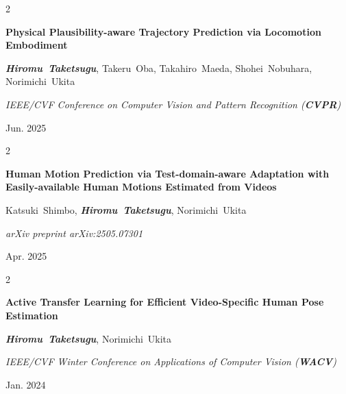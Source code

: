 \documentclass[10pt, letterpaper]{article}
\newenvironment{twocolentry}[2][]{
    \onecolentry
    \def\secondColumn{#2}
    \setcolumnwidth{\fill, 4.5 cm}
    \begin{paracol}{2}
}{
    \switchcolumn \raggedleft \secondColumn
    \end{paracol}
    \endonecolentry
} %
\begin{document}
        \vspace{0.2 cm}
        
        \begin{samepage}
            \begin{twocolentry}{
                Jun. 2025
            }
                \textbf{Physical Plausibility-aware Trajectory Prediction via Locomotion Embodiment}

                \vspace{0.10 cm}

                \mbox{\textbf{\textit{Hiromu Taketsugu}}}, \mbox{Takeru Oba}, \mbox{Takahiro Maeda}, \mbox{Shohei Nobuhara}, \mbox{Norimichi Ukita}
                \vspace{0.10 cm}

                \textit{IEEE/CVF Conference on Computer Vision and Pattern Recognition (\textbf{CVPR})}
            \end{twocolentry}
        \end{samepage}

        \vspace{0.2 cm}

        \begin{samepage}
            \begin{twocolentry}{
                Apr. 2025
            }
                \textbf{Human Motion Prediction via Test-domain-aware Adaptation with Easily-available Human Motions Estimated from Videos}

                \vspace{0.10 cm}

                \mbox{Katsuki Shimbo}, \mbox{\textbf{\textit{Hiromu Taketsugu}}}, \mbox{Norimichi Ukita}
                \vspace{0.10 cm}

                \textit{arXiv preprint arXiv:2505.07301}
            \end{twocolentry}
        \end{samepage}

        \vspace{0.2 cm}

        \begin{samepage}
            \begin{twocolentry}{
                Jan. 2024
            }
                \textbf{Active Transfer Learning for Efficient Video-Specific Human Pose Estimation}

                \vspace{0.10 cm}

                \mbox{\textbf{\textit{Hiromu Taketsugu}}}, \mbox{Norimichi Ukita}
                \vspace{0.10 cm}

                \textit{IEEE/CVF Winter Conference on Applications of Computer Vision (\textbf{WACV})}
            \end{twocolentry}
        \end{samepage}
\end{document}
